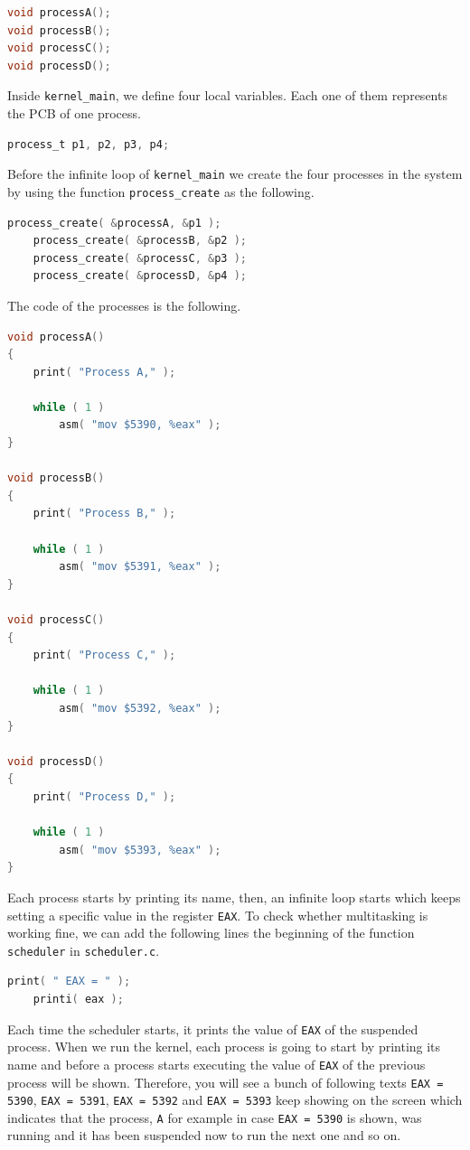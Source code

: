 \begin{lstlisting}[language=C]
void processA();
void processB();
void processC();
void processD();
\end{lstlisting}

Inside \lstinline!kernel_main!, we define four local variables. Each one
of them represents the PCB of one process.

\begin{lstlisting}[language=C]
    process_t p1, p2, p3, p4;
\end{lstlisting}

Before the infinite loop of \lstinline!kernel_main! we create the four
processes in the system by using the function \lstinline!process_create!
as the following.

\begin{lstlisting}[language=C]
    process_create( &processA, &p1 );
    process_create( &processB, &p2 );
    process_create( &processC, &p3 );
    process_create( &processD, &p4 );
\end{lstlisting}

The code of the processes is the following.

\begin{lstlisting}[language=C]
void processA()
{
    print( "Process A," );

    while ( 1 )
        asm( "mov $5390, %eax" );
}

void processB()
{
    print( "Process B," );

    while ( 1 )
        asm( "mov $5391, %eax" );
}

void processC()
{
    print( "Process C," );

    while ( 1 )
        asm( "mov $5392, %eax" );
}

void processD()
{
    print( "Process D," );

    while ( 1 )
        asm( "mov $5393, %eax" );
}
\end{lstlisting}

Each process starts by printing its name, then, an infinite loop starts
which keeps setting a specific value in the register \lstinline!EAX!. To
check whether multitasking is working fine, we can add the following
lines the beginning of the function \lstinline!scheduler! in
\lstinline!scheduler.c!.

\begin{lstlisting}[language=C]
    print( " EAX = " );
    printi( eax );
\end{lstlisting}

Each time the scheduler starts, it prints the value of \lstinline!EAX!
of the suspended process. When we run the kernel, each process is going
to start by printing its name and before a process starts executing the
value of \lstinline!EAX! of the previous process will be shown.
Therefore, you will see a bunch of following texts
\lstinline!EAX = 5390!, \lstinline!EAX = 5391!, \lstinline!EAX = 5392!
and \lstinline!EAX = 5393! keep showing on the screen which indicates
that the process, \lstinline!A! for example in case
\lstinline!EAX = 5390! is shown, was running and it has been suspended
now to run the next one and so on.

